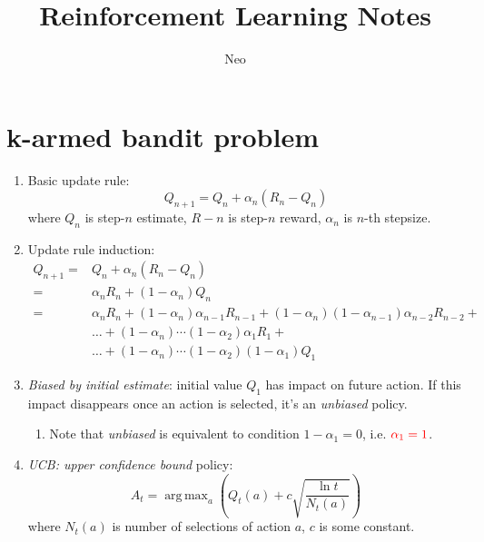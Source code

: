 \documentclass{article}
\DeclareMathOperator*{\argmax}{arg\,max}
\begin{document}
\title{Reinforcement Learning Notes}
\author{Neo}
\date{}
\maketitle

\tableofcontents

\section{k-armed bandit problem}

\begin{enumerate}
  \item Basic update rule:
    \[ Q_{n+1} = Q_n + \alpha_n (R_n-Q_n)\]
    where \(Q_n\) is step-\(n\) estimate, \(R-n\) is step-\(n\) reward, \(\alpha_n\) is \(n\)-th stepsize.
  \item Update rule induction:
    \begin{align*}
      Q_{n+1}= & Q_n + \alpha_{n} (R_n - Q_n)                                                                              \\
      =        & \alpha_{n}R_n + (1-\alpha_{n})Q_n                                                                         \\
      =        & \alpha_{n}R_n + (1-\alpha_{n})\alpha_{n-1} R_{n-1} + (1-\alpha_{n})(1-\alpha_{n-1})\alpha_{n-2} R_{n-2} + \\
               & \dots + (1-\alpha_{n})\cdots(1-\alpha_{2})\alpha_1 R_1 +                                                  \\
               & \dots + (1-\alpha_{n})\cdots(1-\alpha_{2})(1-\alpha_1) Q_1
    \end{align*}
  \item \emph{Biased by initial estimate}: initial value \(Q_1\) has impact on future action. If this impact disappears once an action is selected, it's an \emph{unbiased} policy.
    \begin{enumerate}
      \item Note that \emph{unbiased} is equivalent to condition \(1-\alpha_1 = 0\), i.e. \(\color{red}\alpha_1=1\).
    \end{enumerate}
  \item \emph{UCB: upper confidence bound} policy:
    \[ A_t = \argmax_a \left(Q_t(a) + c \sqrt{\frac{\ln t}{N_t(a)}} \right) \]
    where \(N_t(a)\) is number of selections of action \(a\), \(c\) is some constant.
\end{enumerate}
\end{document}
